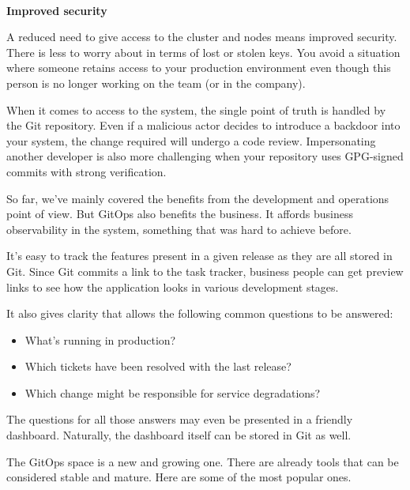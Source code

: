 \hspace*{\fill} \\ %
\noindent
\textbf{Improved security}

A reduced need to give access to the cluster and nodes means improved security. There is less to worry about in terms of lost or stolen keys. You avoid a situation where someone retains access to your production environment even though this person is no longer working on the team (or in the company).

When it comes to access to the system, the single point of truth is handled by the Git repository. Even if a malicious actor decides to introduce a backdoor into your system, the change required will undergo a code review. Impersonating another developer is also more challenging when your repository uses GPG-signed commits with strong verification.

So far, we've mainly covered the benefits from the development and operations point of view. But GitOps also benefits the business. It affords business observability in the system, something that was hard to achieve before.

It's easy to track the features present in a given release as they are all stored in Git. Since Git commits a link to the task tracker, business people can get preview links to see how the application looks in various development stages. 

It also gives clarity that allows the following common questions to be answered:

\begin{itemize}
\item 
What's running in production?

\item 
Which tickets have been resolved with the last release?

\item 
Which change might be responsible for service degradations?
\end{itemize}

The questions for all those answers may even be presented in a friendly dashboard. Naturally, the dashboard itself can be stored in Git as well.


The GitOps space is a new and growing one. There are already tools that can be considered stable and mature. Here are some of the most popular ones.


